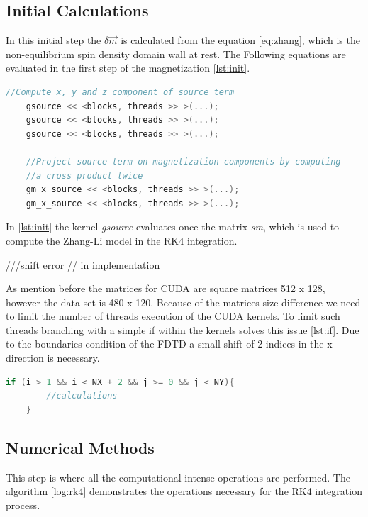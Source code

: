\subsection{Initial Calculations}

In this initial step the $ \delta \vec{m}$ is calculated from the equation \ref{eq:zhang}, which is the non-equilibrium spin density \cite{claudio} domain wall at rest. The Following equations are evaluated in the first step of the magnetization \ref{lst:init}.

\begin{lstlisting}[language=C++, label={lst:init}, caption={Initial calculations}]
	//Compute x, y and z component of source term
    gsource << <blocks, threads >> >(...);
    gsource << <blocks, threads >> >(...);
    gsource << <blocks, threads >> >(...);

    //Project source term on magnetization components by computing
    //a cross product twice
    gm_x_source << <blocks, threads >> >(...);
    gm_x_source << <blocks, threads >> >(...);
\end{lstlisting}

In \ref{lst:init} the kernel \textit{gsource} evaluates once the matrix \textit{sm}, which is used to compute the Zhang-Li model in the RK4 integration. 

///shift error
// in implementation

As mention before the matrices for CUDA are square matrices 512 x 128, however the data set is 480 x 120. Because of the matrices size difference we need to limit the number of threads execution of the CUDA kernels. To limit such threads branching with a simple if within the kernels solves this issue \ref{lst:if}. Due to the boundaries condition of the FDTD a small shift of 2 indices in the x direction is necessary. 

\begin{lstlisting}[language=C++, label={lst:if}, caption={Laplacian X using global memory}]
    if (i > 1 && i < NX + 2 && j >= 0 && j < NY){
    	//calculations
    }
\end{lstlisting}

\subsection{Numerical Methods}

This step is where all the computational intense operations are performed. The algorithm \ref{log:rk4} demonstrates the operations necessary for the RK4 integration process.

